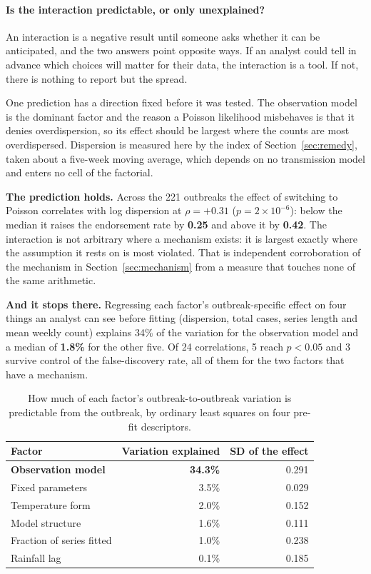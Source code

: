\documentclass[11pt,a4paper]{article}
\begin{document}
\paragraph{Is the interaction predictable, or only unexplained?} An interaction
is a negative result until someone asks whether it can be anticipated, and the
two answers point opposite ways. If an analyst could tell in advance which
choices will matter for their data, the interaction is a tool. If not, there is
nothing to report but the spread.

One prediction has a direction fixed before it was tested. The observation model
is the dominant factor and the reason a Poisson likelihood misbehaves is that it
denies overdispersion, so its effect should be largest where the counts are most
overdispersed. Dispersion is measured here by the index of Section~\ref{sec:remedy},
taken about a five-week moving average, which depends on no transmission model and
enters no cell of the factorial.

\textbf{The prediction holds.} Across the 221 outbreaks the effect of switching to
Poisson correlates with log dispersion at $\rho = +0.31$
($p = 2\times10^{-6}$): below the median it raises the endorsement rate by
\textbf{0.25} and above it by \textbf{0.42}. The interaction is not arbitrary
where a mechanism exists: it is largest exactly where the assumption it rests
on is most violated. That is independent corroboration of the mechanism in
Section~\ref{sec:mechanism} from a measure that touches none of the same
arithmetic.

\textbf{And it stops there.} Regressing each factor's outbreak-specific effect on
four things an analyst can see before fitting (dispersion, total cases, series
length and mean weekly count) explains 34\% of the variation for the
observation model and a median of \textbf{1.8\%} for the other five. Of 24
correlations, 5 reach $p<0.05$ and 3 survive control of the false-discovery rate,
all of them for the two factors that have a mechanism.

\begin{table}[htbp]
\centering
\caption{How much of each factor's outbreak-to-outbreak variation is predictable
from the outbreak, by ordinary least squares on four pre-fit descriptors.}
\begin{tabular}{lrr}
\toprule
Factor & Variation explained & SD of the effect \\
\midrule
\textbf{Observation model} & \textbf{34.3\%} & 0.291 \\
Fixed parameters & 3.5\% & 0.029 \\
Temperature form & 2.0\% & 0.152 \\
Model structure & 1.6\% & 0.111 \\
Fraction of series fitted & 1.0\% & 0.238 \\
Rainfall lag & 0.1\% & 0.185 \\
\bottomrule
\end{tabular}
\end{table}
\end{document}
